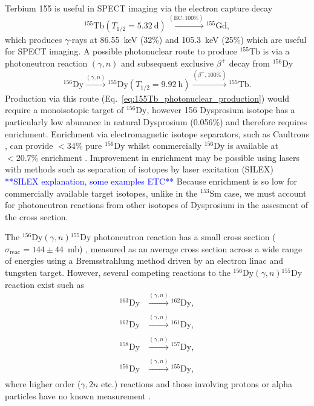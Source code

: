 Terbium 155 is useful in SPECT imaging via the electron capture decay
\begin{equation}
^{155}\mathrm{Tb}\left(T_{1/2} = 5.32~\mathrm{\si{\day}}\right)\xrightarrow[]{\left(\mathrm{EC}, \mathrm{100\%}\right)}{}^{155}\mathrm{Gd},
\label{eq:Tb155_decay}
\end{equation}
which produces $\gamma$-rays at 86.55~\si{\kilo\electronvolt} (32\%) and 105.3~\si{\kilo\electronvolt} (25\%)\cite{muller2012unique} which are useful for SPECT imaging. A possible photonuclear route to produce $^{155}\mathrm{Tb}$ is via a photoneutron reaction $\left(\gamma,n\right)$ and subsequent exclusive $\beta^{+}$ decay from $^{156}\mathrm{Dy}$
\begin{equation}
^{156}\mathrm{Dy}\xrightarrow[]{\left(\gamma,n\right)}{}^{155}\mathrm{Dy}\left(T_{1/2} = 9.92~\mathrm{\si{\hour}}\right)\xrightarrow[]{\left(\beta^{+},\mathrm{100\%}\right)}{}^{155}\mathrm{Tb}.    
\label{eq:155Tb_photonuclear_production}
\end{equation}
Production via this route (Eq.~\ref{eq:155Tb_photonuclear_production}) would require a monoisotopic target of $^{156}\mathrm{Dy}$, however 156 Dysprosium isotope has a particularly low abunance in natural Dysprosium (0.056\%) and therefore requires enrichment. Enrichment via electromagnetic isotope separators, such as Caultrons \cite{bell1987stable}, can provide $< 34\%$ pure $^{156}\mathrm{Dy}$ whilst commercially $^{156}\mathrm{Dy}$ is available at $< 20.7\%$ enrichment \cite{}. Improvement in enrichment may be possible using lasers with methods such as separation of isotopes by laser excitation (SILEX)\cite{} \textcolor{blue}{**SILEX explanation, some examples ETC**} Because enrichment is so low for commercially available target isotopes, unlike in the $^{153}\mathrm{Sm}$ case, we must account for photoneutron reactions from other isotopes of Dysprosium in the assesment of the cross section.

The $^{156}\mathrm{Dy}\left(\gamma,n\right){}^{155}\mathrm{Dy}$ photoneutron reaction has a small cross section ($\sigma_{\mathrm{reac}} = 144\pm 44$~\si{\milli\barn}) \cite{vagena2017photodisintegration}, measured as an average cross section across a wide range of energies using a Bremsstrahlung method driven by an electron linac and tungsten target. However, several competing reactions to the $^{156}\mathrm{Dy}\left(\gamma,n\right){}^{155}\mathrm{Dy}$ reaction exist such as \cite{renstrom2018verification,vagena2017photodisintegration}
\begin{align}
^{163}\mathrm{Dy}&\xrightarrow[]{\left(\gamma,n\right)}{}^{162}\mathrm{Dy}, \\
^{162}\mathrm{Dy}&\xrightarrow[]{\left(\gamma,n\right)}{}^{161}\mathrm{Dy}, \\
^{158}\mathrm{Dy}&\xrightarrow[]{\left(\gamma,n\right)}{}^{157}\mathrm{Dy}, \\
^{156}\mathrm{Dy}&\xrightarrow[]{\left(\gamma,n\right)}{}^{155}\mathrm{Dy},
\label{eq:155Tb_photonuclear_disruptors}    
\end{align}
where higher order ($\gamma,2n$ etc.) reactions and those involving protons or alpha particles have no known measurement \cite{zerkin2018experimental}.

